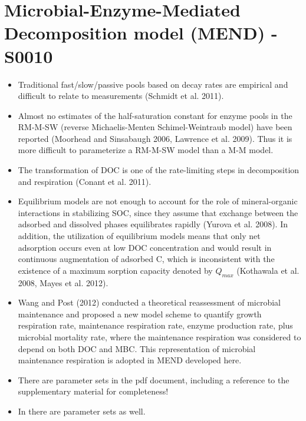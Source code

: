 \documentclass[american, 12pt]{article}
\newcommand{\red}[1]{{\color{red}#1}}
\begin{document}
\section{Microbial-Enzyme-Mediated Decomposition model (MEND) - S0010}
\citep{Wang2013EcologicalApplications, Li2014Biogeochemistry}
\begin{itemize}
  \item Traditional fast/slow/passive pools based on decay rates are empirical and difficult to relate to measurements (Schmidt et al. 2011).
  \item Almost no estimates of the half-saturation constant for enzyme pools in the RM-M-SW (reverse Michaelis-Menten Schimel-Weintraub model) have been reported (Moorhead and Sinsabaugh 2006, Lawrence et al. 2009). Thus it is more difficult to parameterize a RM-M-SW model than a M-M model.
  \item The transformation of DOC is one of the rate-limiting steps in decomposition and respiration (Conant et al. 2011).
  \item Equilibrium models are not enough to account for the role of mineral-organic interactions in stabilizing SOC, since they assume that exchange between the adsorbed and dissolved phases equilibrates rapidly (Yurova et al. 2008). In addition, the utilization of equilibrium models means that only net adsorption occurs even at low DOC concentration and would result in continuous augmentation of adsorbed C, which is inconsistent with the existence of a maximum sorption capacity denoted by $Q_{max}$ (Kothawala et al. 2008, Mayes et al. 2012).
  \item Wang and Post (2012) conducted a theoretical reassessment of microbial maintenance and proposed a new model scheme to quantify growth respiration rate, maintenance respiration rate, enzyme production rate, plus microbial mortality rate, where the maintenance respiration was considered to depend on both DOC and MBC. This representation of microbial maintenance respiration is adopted in MEND developed here.
  \item \red{There are parameter sets in the pdf document, including a reference to the supplementary material for completeness!}
  \item \red{In \cite{Li2014Biogeochemistry} there are parameter sets as well.}
\end{itemize}
\end{document}
